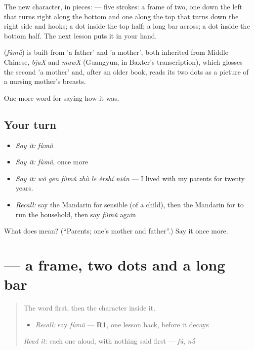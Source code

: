 The new character, in pieces:  — five strokes: a frame of two, one down the left that turns right along the bottom and one along the top that turns down the right side and hooks; a dot inside the top half; a long bar across; a dot inside the bottom half. The next lesson puts it in your hand.

\begin{cousinweb}
\textbf{} (\emph{fùmǔ}) is built from  'a father' and  'a mother', both inherited from Middle Chinese, \emph{bjuX} and \emph{muwX} (Guangyun, in Baxter's transcription), which glosses the second 'a mother' and, after an older book, reads its two dots as a picture of a nursing mother's breasts.
\end{cousinweb}

\begin{grammarlens}[title={What you've built}]
One more word for saying how it was.
\end{grammarlens}

\subsection*{Your turn}
\begin{itemize}
\raggedright
  \item \emph{Say it:} \emph{fùmǔ}
  \item \emph{Say it:} \emph{fùmǔ}, once more
  \item \emph{Say it:} \emph{wǒ gēn fùmǔ zhù le èrshí nián} — I lived with my parents for twenty years.
  \item \emph{Recall:} say the Mandarin for sensible (of a child), then the Mandarin for to run the household, then say \emph{fùmǔ} again
\end{itemize}

\begin{tcolorbox}[breakable,colback=teal!4,colframe=teal!35!black,title={Before you move on}]
What does  mean? (\textquotedblleft{}Parents; one's mother and father\textquotedblright{}.) Say it once more.
\end{tcolorbox}
\section[\texorpdfstring{\zh{母} (mǔ)}{母 (mǔ)}]{ — a frame, two dots and a long bar}

\label{lesson:ZH-W509-mu-mother}



\begin{quote}
The word first, then the character inside it.

\begin{itemize}
\raggedright
  \item \emph{Recall:} say \emph{fùmǔ} — \textbf{R1}, one lesson back, before it decays
\end{itemize}

\begin{quote}
 
\end{quote}

\emph{Read it:} each one aloud, with nothing said first — \emph{fù}, \emph{nǚ}
\end{quote}

